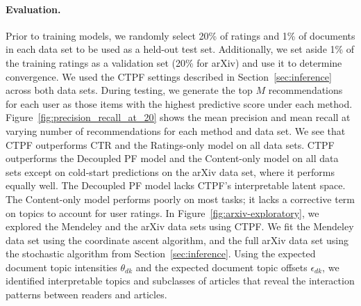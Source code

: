 \documentclass{article}
\newcommand{\mysec}[1]{Section~\ref{sec:#1}}
\newcommand{\myfig}[1]{Figure~\ref{fig:#1}}
\begin{document}
\paragraph{Evaluation.} Prior to training models, we randomly select 20\% of
ratings and 1\% of documents in each data set to be used as a held-out
test set. Additionally, we set aside 1\% of the training ratings as a
validation set (20\% for arXiv) and use it to determine
convergence. We used the CTPF settings described in \mysec{inference}
across both data sets. During testing, we generate the top $M$
recommendations for each user as those items with the highest
predictive score under each method.
\myfig{precision_recall_at_20} shows the mean precision and mean
recall at varying number of recommendations for each method and data
set. We see that CTPF outperforms CTR and the Ratings-only model on
all data sets. CTPF outperforms the Decoupled PF model and the
Content-only model on all data sets except on cold-start predictions
on the arXiv data set, where it performs equally well. The Decoupled
PF model lacks CTPF's interpretable latent space. The Content-only
model performs poorly on most tasks; it lacks a corrective term on
topics to account for user ratings. In \myfig{arxiv-exploratory}, we
explored the Mendeley and the arXiv data sets using CTPF. We fit the
Mendeley data set using the coordinate ascent algorithm, and the full
arXiv data set using the stochastic algorithm from \mysec{inference}.
Using the expected document topic intensities $\theta_{dk}$ and the
expected document topic offsets $\epsilon_{dk}$, we identified
interpretable topics and subclasses of articles that reveal the
interaction patterns between readers and articles.
\end{document}
